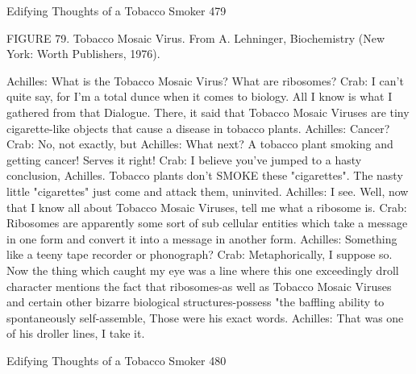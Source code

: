 {Edifying Thoughts of a Tobacco Smoker                                                     479

                       FIGURE 79. Tobacco Mosaic Virus.
        From A. Lehninger, Biochemistry (New York: Worth Publishers, 1976).


Achilles: What is the Tobacco Mosaic Virus? What are ribosomes?
Crab: I can't quite say, for I'm a total dunce when it comes to biology. All I know is what
  I gathered from that Dialogue. There, it said that Tobacco Mosaic Viruses are tiny
  cigarette-like objects that cause a disease in tobacco plants.
Achilles: Cancer?
Crab: No, not exactly, but
Achilles: What next? A tobacco plant smoking and getting cancer! Serves it right!
Crab: I believe you've jumped to a hasty conclusion, Achilles. Tobacco plants don't
  SMOKE these "cigarettes". The nasty little "cigarettes" just come and attack them,
  uninvited.
Achilles: I see. Well, now that I know all about Tobacco Mosaic Viruses, tell me what a
  ribosome is.
Crab: Ribosomes are apparently some sort of sub cellular entities which take a message
  in one form and convert it into a message in another form.
Achilles: Something like a teeny tape recorder or phonograph?
Crab: Metaphorically, I suppose so. Now the thing which caught my eye was a line where
  this one exceedingly droll character mentions the fact that ribosomes-as well as
  Tobacco Mosaic Viruses and certain other bizarre biological structures-possess "the
  baffling ability to spontaneously self-assemble, Those were his exact words.
Achilles: That was one of his droller lines, I take it.




Edifying Thoughts of a Tobacco Smoker                                                  480

}
